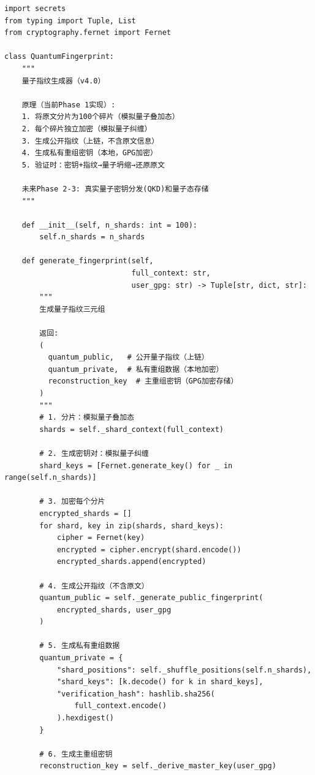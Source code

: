\begin{lstlisting}[style=python,
  caption={量子指纹生成器（v4.0新增，密码学模拟量子态）
    · DNA: \#龍芯⚡️2026-03-10-QUANTUM-v4.0},
  label={lst:quantum}]
import secrets
from typing import Tuple, List
from cryptography.fernet import Fernet

class QuantumFingerprint:
    """
    量子指纹生成器（v4.0）
    
    原理（当前Phase 1实现）:
    1. 将原文分片为100个碎片（模拟量子叠加态）
    2. 每个碎片独立加密（模拟量子纠缠）
    3. 生成公开指纹（上链，不含原文信息）
    4. 生成私有重组密钥（本地，GPG加密）
    5. 验证时：密钥+指纹→量子坍缩→还原原文
    
    未来Phase 2-3: 真实量子密钥分发(QKD)和量子态存储
    """
    
    def __init__(self, n_shards: int = 100):
        self.n_shards = n_shards
    
    def generate_fingerprint(self,
                             full_context: str,
                             user_gpg: str) -> Tuple[str, dict, str]:
        """
        生成量子指纹三元组
        
        返回:
        (
          quantum_public,   # 公开量子指纹（上链）
          quantum_private,  # 私有重组数据（本地加密）
          reconstruction_key  # 主重组密钥（GPG加密存储）
        )
        """
        # 1. 分片：模拟量子叠加态
        shards = self._shard_context(full_context)
        
        # 2. 生成密钥对：模拟量子纠缠
        shard_keys = [Fernet.generate_key() for _ in range(self.n_shards)]
        
        # 3. 加密每个分片
        encrypted_shards = []
        for shard, key in zip(shards, shard_keys):
            cipher = Fernet(key)
            encrypted = cipher.encrypt(shard.encode())
            encrypted_shards.append(encrypted)
        
        # 4. 生成公开指纹（不含原文）
        quantum_public = self._generate_public_fingerprint(
            encrypted_shards, user_gpg
        )
        
        # 5. 生成私有重组数据
        quantum_private = {
            "shard_positions": self._shuffle_positions(self.n_shards),
            "shard_keys": [k.decode() for k in shard_keys],
            "verification_hash": hashlib.sha256(
                full_context.encode()
            ).hexdigest()
        }
        
        # 6. 生成主重组密钥
        reconstruction_key = self._derive_master_key(user_gpg)
        

\end{lstlisting}
